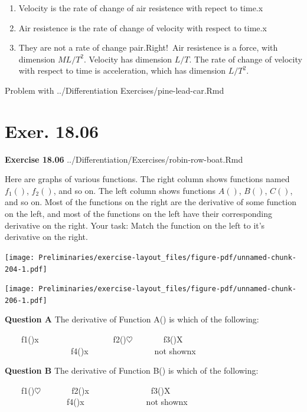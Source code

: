 \documentclass[
  letterpaper,
  DIV=11,
  numbers=noendperiod,
  oneside]{article}
\providecommand{\tightlist}{%
  \setlength{\itemsep}{0pt}\setlength{\parskip}{0pt}}\usepackage{longtable,booktabs,array}
\begin{document}
\begin{multicols}{2}
\begin{enumerate}
\def\labelenumi{\roman{enumi}.}
\tightlist
\item
  {Velocity is the rate of change of air resistence with repect to
  time.{x}}\\
\item
  {Air resistence is the rate of change of velocity with respect to
  time.{x}}\\
\item
  {They are not a rate of change pair.{Right!~Air resistence is a force,
  with dimension \(M L/T^2\). Velocity has dimension \(L/T\). The rate
  of change of velocity with respect to time is acceleration, which has
  dimension \(L/T^2\).}}
\end{enumerate}

Problem with ../Differentiation Exercises/pine-lead-car.Rmd

\hypertarget{exer.-18.06}{%
\section*{Exer. 18.06}\label{exer.-18.06}}

\textbf{Exercise 18.06} ../Differentiation/Exercises/robin-row-boat.Rmd

Here are graphs of various functions. The right column shows functions
named \(f_1()\), \(f_2()\), and so on. The left column shows functions
\(A()\), \(B()\), \(C()\), and so on. Most of the functions on the right
are the derivative of some function on the left, and most of the
functions on the left have their corresponding derivative on the right.
Your task: Match the function on the left to it's derivative on the
right.

\texttt{[image: Preliminaries/exercise-layout\_files/figure-pdf/unnamed-chunk-204-1.pdf]}

\texttt{[image: Preliminaries/exercise-layout\_files/figure-pdf/unnamed-chunk-206-1.pdf]}

\textbf{Question A} The derivative of Function A() is which of the
following:

~~~~{f1(){x~~~~~~~~~~~}}~~~~~~~{f2(){\(\heartsuit\ \)}}~~~~~~~{f3(){︎X
~~~~~~~~~}}~~~~~~~{f4(){x~~~~~~~~~}}~~~~~~~{not shown{x}}

\textbf{Question B} The derivative of Function B() is which of the
following:

~~~~{f1(){\(\heartsuit\ \)}}~~~~~~~{f2(){x~~~~~~~~}}~~~~~~~{f3(){︎X
~~~~~~~~}}~~~~~~~{f4(){x~~~~~~~~}}~~~~~~~{not shown{x}}


\end{multicols}
\end{document}
